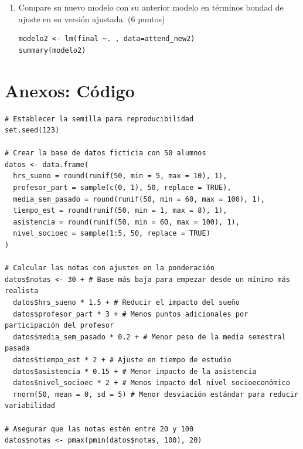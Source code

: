 \documentclass[letterpaper,11pt]{article}
\begin{document}
\begin{enumerate}
    \item Compare su nuevo modelo con su anterior modelo en términos bondad de ajuste en su versión ajustada. (6 puntos)
 \begin{lstlisting}
modelo2 <- lm(final ~. , data=attend_new2)
summary(modelo2)

\end{lstlisting}

\end{enumerate}
\newpage
\section{Anexos: Código}
\begin{verbatim}
# Establecer la semilla para reproducibilidad
set.seed(123)

# Crear la base de datos ficticia con 50 alumnos
datos <- data.frame(
  hrs_sueno = round(runif(50, min = 5, max = 10), 1),
  profesor_part = sample(c(0, 1), 50, replace = TRUE),
  media_sem_pasado = round(runif(50, min = 60, max = 100), 1),
  tiempo_est = round(runif(50, min = 1, max = 8), 1),
  asistencia = round(runif(50, min = 60, max = 100), 1),
  nivel_socioec = sample(1:5, 50, replace = TRUE)
)

# Calcular las notas con ajustes en la ponderación
datos$notas <- 30 + # Base más baja para empezar desde un mínimo más realista
  datos$hrs_sueno * 1.5 + # Reducir el impacto del sueño
  datos$profesor_part * 3 + # Menos puntos adicionales por participación del profesor
  datos$media_sem_pasado * 0.2 + # Menor peso de la media semestral pasada
  datos$tiempo_est * 2 + # Ajuste en tiempo de estudio
  datos$asistencia * 0.15 + # Menor impacto de la asistencia
  datos$nivel_socioec * 2 + # Menos impacto del nivel socioeconómico
  rnorm(50, mean = 0, sd = 5) # Menor desviación estándar para reducir variabilidad

# Asegurar que las notas estén entre 20 y 100
datos$notas <- pmax(pmin(datos$notas, 100), 20)
\end{verbatim}
\end{document}
